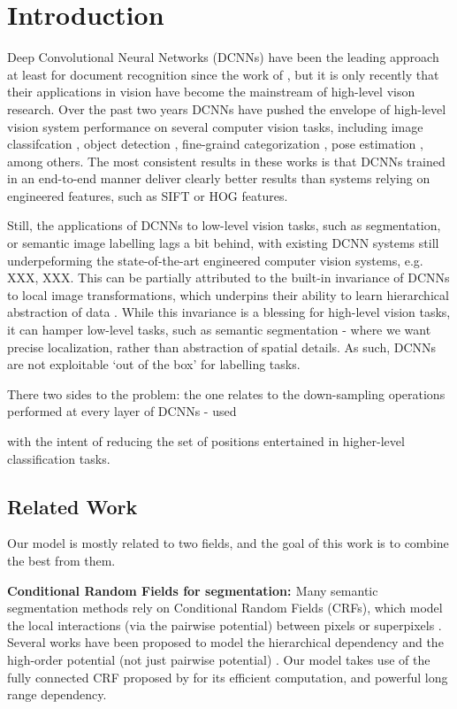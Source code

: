 \section{Introduction}
\label{sec:intro}
 Deep Convolutional Neural Networks (DCNNs) have been the leading approach  at least
for document recognition since the  work of \citet{LeCun1998}, but 
it is only recently that their applications in  vision have become the mainstream of high-level vison research.
Over the past two years  DCNNs have 
 pushed the envelope of high-level vision system performance on several computer vision tasks, including image classifcation \citet{KrizhevskyNIPS2013, papandreou2014untangling, sermanet2013overfeat, simonyan2014very, szegedy2014going}, object detection \citet{girshick2014rcnn}, fine-graind categorization \citet{zhang2014part}, pose estimation \citet{chen2014articulated, tompson2014joint}, among others.
The most consistent results in these works is that DCNNs trained in an end-to-end manner  deliver  clearly better results than systems relying on engineered features, such as SIFT or HOG features.

Still, the applications of DCNNs to low-level vision tasks, such as segmentation, or semantic image labelling  lags a bit behind, with existing DCNN systems still underpeforming the state-of-the-art engineered computer vision systems, e.g. XXX, XXX.
 This can be partially attributed to the built-in  invariance of DCNNs to local image transformations, which underpins their ability to learn hierarchical abstraction of data \citep{zeiler2014visualizing}.
While this invariance is a blessing for high-level vision tasks, it can hamper low-level tasks, such as semantic segmentation - where we want precise localization, rather than abstraction of spatial details.  As such, DCNNs are not exploitable `out of the box' for labelling tasks. 

There two sides to the problem: the one relates to the down-sampling operations performed at every layer of DCNNs - used 


 with the intent of reducing the set of positions entertained in higher-level classification tasks. 
\subsection{Related Work}
Our model is mostly related to two fields, and the goal of this work is to combine the best from them.

{\bf{Conditional Random Fields for segmentation: }} Many semantic segmentation methods rely on Conditional Random Fields (CRFs), which model the local interactions (via the pairwise potential) between pixels \citep{rother2004grabcut, shotton2009textonboost} or superpixels \citep{lucchi2011spatial}. Several works have been proposed to model the hierarchical dependency \citep{he2004multiscale, ladicky2009associative, lempitsky2011pylon} and the high-order potential (not just pairwise potential) \citep{delong2012fast, gonfaus2010harmony, kohli2009robust, krahenbuhl2011efficient}. Our model takes use of the fully connected CRF proposed by \citet{krahenbuhl2011efficient} for its efficient computation, and powerful long range dependency.

